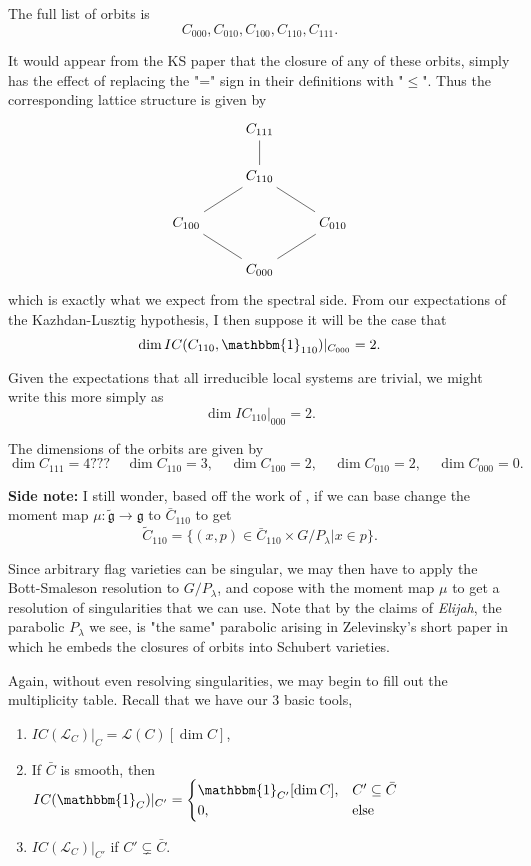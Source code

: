 \documentclass{memoir}
\newcommand{\mc}{\mathcal}
\newcommand{\mf}{\mathfrak}
\newcommand{\tx}{\text}
\theoremstyle{definition}
\begin{document}
	The full list of orbits is
	$$C_{000}, C_{010}, C_{100}, C_{110}, C_{111}.$$
	
	It would appear from the KS paper that the closure of any of these orbits, simply has the effect of replacing the "=" sign in their definitions with "$\leq$".  
	Thus the corresponding lattice structure is given by 
	$$\begin{tikzcd}
		& {C_{111}} \\
		& {C_{110}} \\
		{C_{100}} && {C_{010}} \\
		& {C_{000}}
		\arrow[no head, from=1-2, to=2-2]
		\arrow[no head, from=2-2, to=3-1]
		\arrow[no head, from=3-1, to=4-2]
		\arrow[no head, from=4-2, to=3-3]
		\arrow[no head, from=3-3, to=2-2]
	\end{tikzcd}$$
%
	which is exactly what we expect from the spectral side. 
	From our expectations of the Kazhdan-Lusztig hypothesis, I then suppose it will be the case that
	$$\dim IC(C_{110}, \mathbbm{1}_{110})|_{C_{000}}=2.$$
	
	Given the expectations that all irreducible local systems are trivial, we might write this more simply as
	$$\dim IC_{110}|_{000}=2.$$
	
	The dimensions of the orbits are given by
	$$\dim C_{111}=4??? \ \ \ \ \ \dim C_{110}=3, \ \ \ \ \  \dim C_{100}=2, \ \ \ \ \ \dim C_{010}=2,  \ \ \ \ \ \dim C_{000}=0.$$
	
	\textbf{Side note:} I still wonder, based off the work of \cite{Chr}, if we can base change the moment map $\mu:\tilde{\mf{g}}\to\mf{g}$ to $\bar{C}_{110}$ to get
	$$\tilde{C}_{110}=\{(x, p)\in \bar{C}_{110}\times G/P_\lambda | x\in p\}.$$
	
	Since arbitrary flag varieties can be singular, we may then have to apply the Bott-Smaleson resolution to $G/P_\lambda$, and copose with the moment map $\mu$ to get a resolution of singularities that we can use.  
	Note that by the claims of \emph{Elijah}, the parabolic $P_\lambda$ we see, is "the same" parabolic arising in Zelevinsky's short paper in which he embeds the closures of orbits into Schubert varieties.  
	
	Again, without even resolving singularities, we may begin to fill out the multiplicity table.  
	Recall that we have our 3 basic tools,
	\begin{enumerate}
		\item $IC(\mc{L}_C)|_C=\mc{L}(C)[\dim C]$, 
		\item If $\bar{C}$ is smooth, then $IC(\mathbbm{1}_C)|_{C'}=\begin{cases}
			\mathbbm{1}_{C'}[\dim C], & C'\subseteq\bar{C}\\
			0, & \tx{else}
		\end{cases}$
	\item $IC(\mc{L}_C)|_{C'}$ if $C'\subsetneq\bar{C}$.  
	\end{enumerate}
	
\end{document}
